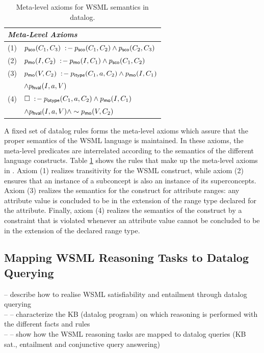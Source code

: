\begin{table}[tb]\label{tab:meta-level}\centering
\begin{small}
\begin{tabular}{|ll|}
  \hline
  \multicolumn{2}{|l|}{\rule{0cm}{3.2mm}{\normalsize \emph{Meta-Level Axioms}}} \\
  \hline
  (1) & $p_{\mathrm{\sf sco}}(C_1,C_3) \;:\!-\: p_{\mathrm{\sf sco}}(C_1,C_2) \wedge p_{\mathrm{\sf sco}}(C_2,C_3)$ \\
  (2) & $p_{\mathrm{\sf mo}}(I,C_2) \;:\!-\: p_{\mathrm{\sf mo}}(I,C_1) \wedge p_{\mathrm{\sf sco}}(C_1,C_2)$ \\
  (3) & $p_{\mathrm{\sf mo}}(V,C_2) \;:\!-\: p_{\mathrm{\sf itype}}(C_1,a,C_2) \wedge p_{\mathrm{\sf mo}}(I,C_1)$ \\
  & \phantom{$\pmo(V,C_2) \dlogrule$} $\wedge p_{\mathrm{\sf hval}}(I,a,V)$ \\
  (4) & $\square\;:\!-\: p_{\mathrm{\sf otype}}(C_1,a,C_2) \wedge p_{\mathrm{\sf mo}}(I,C_1)$ \\
  & \phantom{$\dlogcstr$} $\wedge p_{\mathrm{\sf hval}}(I,a,V) \wedge \sim p_{\mathrm{\sf mo}}(V,C_2)$ \\
 \hline
\end{tabular}
\end{small} \caption{Meta-level axioms for WSML semantics in
datalog.}
\end{table}

A fixed set \mlaxioms of datalog rules forms the meta-level axioms
which assure that the proper semantics of the WSML language is
maintained. In these axioms, the meta-level predicates are
interrelated according to the semantics of the different language
constructs. Table \ref{tab:meta-level} shows the rules that make
up the meta-level axioms in \mlaxioms. Axiom (1) realizes
transitivity for the WSML  construct, while
axiom (2) ensures that an instance of a subconcept is also an
instance of its superconcepts. Axiom (3) realizes the semantics
for the  construct for attribute ranges: any
attribute value is concluded to be in the extension of the range
type declared for the attribute. Finally, axiom (4) realizes the
semantics of the  construct by a constraint that is
violated whenever an attribute value cannot be concluded to be in
the extension of the declared range type.

\subsection{Mapping WSML Reasoning Tasks to Datalog Querying}
-- describe how to realise WSML satisfiability and entailment through datalog querying \\
-- -- characterize the KB (datalog program) on which reasoning is performed with the different facts and rules  \\
-- -- show how the WSML reasoning tasks are mapped to datalog queries (KB sat., entailment and conjunctive query answering) \\

